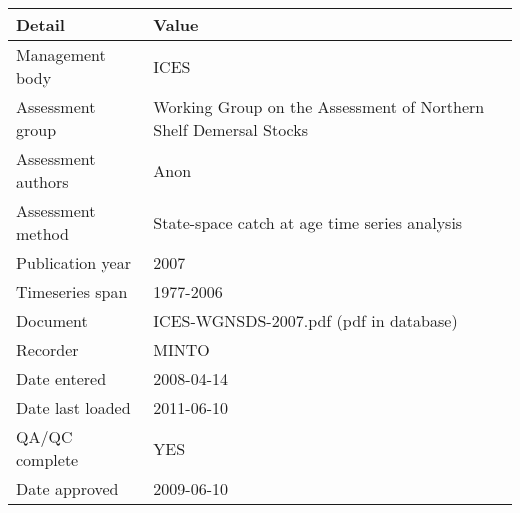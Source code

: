 \begin{table}[htb]
\centering
\begin{tabular}{lp{7cm}}
\toprule
Detail & Value \\
\midrule
Management body    & ICES                                                              \\
Assessment group   & Working Group on the Assessment of Northern Shelf Demersal Stocks \\
Assessment authors & Anon                                                              \\
Assessment method  & State-space catch at age time series analysis                     \\
Publication year   & 2007                                                              \\
Timeseries span    & 1977-2006                                                         \\
Document           & ICES-WGNSDS-2007.pdf (pdf in database)                            \\
Recorder           & MINTO                                                             \\
Date entered       & 2008-04-14                                                        \\
Date last loaded   & 2011-06-10                                                        \\
QA/QC complete     & YES                                                               \\
Date approved      & 2009-06-10                                                        \\
\bottomrule
\end{tabular}
\label{tab:assessdet}
\end{table}
